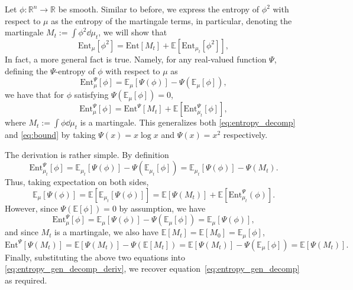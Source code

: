Let \(\phi : \mathbb{R}^n \to \mathbb{R}\) be smooth. 
Similar to before, we express the entropy of \(\phi^2\) with respect to \(\mu\) as 
the entropy of the martingale terms, in particular, denoting the martingale \(M_t := \int \phi^2 \dd \mu_t\), 
we will show that
\begin{equation}\label{eq:entropy_decomp}
  \text{Ent}_\mu[\phi^2] = \text{Ent}[M_t] + \mathbb{E}[\text{Ent}_{\mu_t}[\phi^2]],
\end{equation}
In fact, a more general fact is true. Namely, for any real-valued function \(\Psi\), defining 
the \(\Psi\)-entropy of \(\phi\) with respect to \(\mu\) as
\[\text{Ent}_\mu^\Psi[\phi] = \mathbb{E}_\mu[\Psi(\phi)] - \Psi(\mathbb{E}_\mu[\phi]),\]
we have that for \(\phi\) satisfying \(\Psi(\mathbb{E}_\mu[\phi]) = 0\),
\begin{equation}\label{eq:entropy_gen_decomp}
  \text{Ent}_\mu^\Psi[\phi] = \text{Ent}^\Psi[M_t] + \mathbb{E}[\text{Ent}_{\mu_t}^\Psi[\phi]],
\end{equation}
where \(M_t := \int \phi \dd\mu_t\) is a martingale. 
This generalizes both \eqref{eq:entropy_decomp} and \eqref{eq:bound} by taking \(\Psi(x) = x\log x\) and \(\Psi(x) = x^2\)
respectively. 

The derivation is rather simple. By definition
\[\text{Ent}_{\mu_t}^\Psi[\phi] = \mathbb{E}_{\mu_t}[\Psi(\phi)] - \Psi(\mathbb{E}_{\mu_t}[\phi])
  = \mathbb{E}_{\mu_t}[\Psi(\phi)] - \Psi(M_t).\]
Thus, taking expectation on both sides, 
\begin{equation}\label{eq:entropy_gen_decomp_deriv}
  \mathbb{E}_\mu[\Psi(\phi)] = \mathbb{E}[\mathbb{E}_{\mu_t}[\Psi(\phi)]] = \mathbb{E}[\Psi(M_t)] + \mathbb{E}[\text{Ent}_{\mu_t}^\Psi(\phi)].
\end{equation}
However, since \(\Psi(\mathbb{E}[\phi]) = 0\) by assumption, we have 
\[\text{Ent}_\mu^\Psi[\phi] = \mathbb{E}_\mu[\Psi(\phi)] - \Psi(\mathbb{E}_\mu[\phi]) = \mathbb{E}_\mu[\Psi(\phi)],\]
and since \(M_t\) is a martingale, we also have \(\mathbb{E}[M_t] = \mathbb{E}[M_0] = \mathbb{E}_\mu[\phi]\),
\[\text{Ent}^\Psi[\Psi(M_t)] = \mathbb{E}[\Psi(M_t)] - \Psi(\mathbb{E}[M_t]) = 
  \mathbb{E}[\Psi(M_t)] - \Psi(\mathbb{E}_\mu[\phi]) = \mathbb{E}[\Psi(M_t)].\]
Finally, substituting the above two equations into \eqref{eq:entropy_gen_decomp_deriv}, we recover 
equation~\eqref{eq:entropy_gen_decomp} as required.

